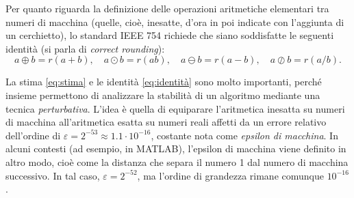 Per quanto riguarda la definizione delle operazioni aritmetiche elementari
tra numeri di macchina (quelle, cioè, inesatte, d'ora in poi indicate
con l'aggiunta di un cerchietto), lo standard IEEE 754 richiede
che siano soddisfatte le seguenti identità (si parla di \emph{correct rounding}):
\begin{equation} \label{eq:identità}
a \oplus b = r(a+b),
\quad a \odot b = r(ab),
\quad a \ominus b = r(a-b),
\quad a \oslash b = r(a/b).
\end{equation}

La stima \eqref{eq:stima} e le identità \eqref{eq:identità} sono molto importanti,
perché insieme permettono di analizzare la stabilità di un algoritmo
mediante una tecnica \emph{perturbativa}. L'idea è quella di
equiparare l'aritmetica inesatta su numeri di macchina
all'aritmetica esatta su numeri reali affetti da un errore relativo
dell'ordine di $\varepsilon =  2^{-53} \approx 1.1 \cdot 10^{-16}$,
costante nota come \emph{epsilon di macchina}.
In alcuni contesti (ad esempio, in MATLAB), l'epsilon di macchina viene definito
in altro modo, cioè come la distanza che separa il numero 1 dal numero di
macchina successivo. In tal caso, $\varepsilon = 2^{-52}$,
ma l'ordine di grandezza rimane comunque $10^{-16}$.

